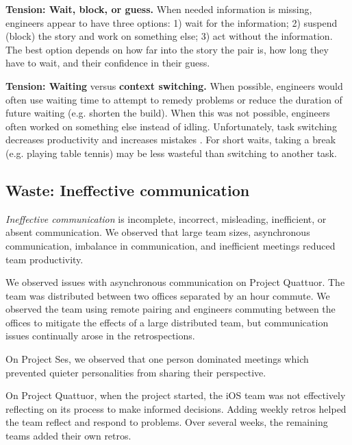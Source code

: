 \textbf{Tension: Wait, block, or guess.}
When needed information is missing, engineers appear to have three options: 1) wait for the information; 2) suspend (block) the story and work on something else; 3) act without the information. The best option depends on how far into the story the pair is, how long they have to wait, and their confidence in their guess.

\textbf{Tension: Waiting} versus \textbf{context switching.}
When possible, engineers would often use waiting time to attempt to remedy problems or reduce the duration of future waiting (e.g. shorten the build). When this was not possible, engineers often worked on something else instead of idling. Unfortunately, task switching decreases productivity and increases mistakes \cite{MonsellTaskSwitching}. For short waits, taking a break (e.g. playing table tennis) may be less wasteful than switching to another task. 

\subsection{Waste: Ineffective communication}
\textit{Ineffective communication} is incomplete, incorrect, misleading, inefficient, or absent communication. We observed that large team sizes, asynchronous communication, imbalance in communication, and inefficient meetings reduced team productivity.

We observed issues with asynchronous communication on Project Quattuor. The team was distributed between two offices separated by an hour commute. We observed the team using remote pairing and engineers commuting between the offices to mitigate the effects of a large distributed team, but communication issues continually arose in the retrospections.

On Project Ses, we observed that one person dominated meetings which prevented quieter personalities from sharing their perspective. 

On Project Quattuor, when the project started, the iOS team was not effectively reflecting on its process to make informed decisions. Adding weekly retros helped the team reflect and respond to problems. Over several weeks, the remaining teams added their own retros. 




